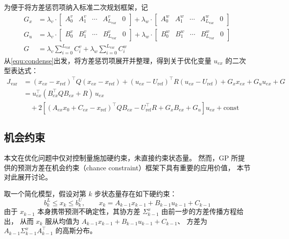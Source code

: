 为便于将方差惩罚项纳入标准二次规划框架，记
\begin{equation}
    \begin{aligned}
        G_x &= \lambda_v \cdot \begin{bmatrix} A^v_0 & A^v_1 & \cdots & A^v_{L_{\mathrm{var}}} & 0 \end{bmatrix}
             + \lambda_w \cdot \begin{bmatrix} A^w_0 & A^w_1 & \cdots & A^w_{L_{\mathrm{var}}} & 0 \end{bmatrix} \\
        G_u &= \lambda_v \cdot \begin{bmatrix} B^v_0 & B^v_1 & \cdots & B^v_{L_{\mathrm{var}}} & 0 \end{bmatrix}
             + \lambda_w \cdot \begin{bmatrix} B^w_0 & B^w_1 & \cdots & B^w_{L_{\mathrm{var}}} & 0 \end{bmatrix} \\
        G   &= \lambda_v \sum_{i=0}^{L_{\mathrm{var}}} C^v_i 
             + \lambda_w \sum_{i=0}^{L_{\mathrm{var}}} C^w_i
    \end{aligned}
\end{equation}
从\autoref{equ:condense}出发，将方差惩罚项展开并整理，得到关于优化变量 $u_{ex}$ 的二次型表达式：
\begin{equation}
    \begin{aligned}
        J_{\mathrm{var}} 
        &= (x_{ex} - x_{\mathrm{ref}})^\top Q (x_{ex} - x_{\mathrm{ref}}) 
         + (u_{ex} - U_{\mathrm{ref}})^\top R (u_{ex} - U_{\mathrm{ref}}) 
         + G_x x_{ex} + G_u u_{ex} + G \\
        &= u_{ex}^\top (B_{ex}^\top Q B_{ex} + R)\, u_{ex} \\
        &\quad + 2\left[(A_{ex} x_0 + C_{ex} - x_{\mathrm{ref}})^\top Q B_{ex} 
          - U_{\mathrm{ref}}^\top R + G_x B_{ex} + G_u \right] u_{ex} + \text{const}
    \end{aligned}
\end{equation}

\subsection{机会约束}

本文在优化问题中仅对控制量施加硬约束，未直接约束状态量。
然而，GP 所提供的预测方差在机会约束（chance constraint）框架下具有重要的应用价值，
本节对此展开讨论。

取一个简化模型，假设对第 $k$ 步状态量存在如下硬约束：
\begin{equation}
    b_k^L \leq x_k \leq b_k^U, \qquad 
    x_k = A_{k-1} x_{k-1} + B_{k-1} u_{k-1} + C_{k-1}
\end{equation}
由于 $x_{k-1}$ 本身携带预测不确定性，其协方差 $\Sigma_{k-1}^x$ 由前一步的方差传播方程给出，
从而 $x_k$ 服从均值为 $A_{k-1}x_{k-1} + B_{k-1}u_{k-1} + C_{k-1}$、
方差为 $A_{k-1}\Sigma_{k-1}^x A_{k-1}^\top$ 的高斯分布。

